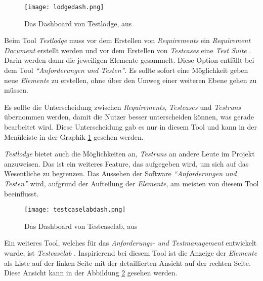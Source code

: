 \documentclass[11pt,a4paper]{report}
\begin{document}

\begin{figure}[htpb]
  \centering
  \texttt{[image: lodgedash.png]}
  \caption{Das Dashboard von Testlodge, aus \cite{testlodge}}
  \label{f:lodgedash}
\end{figure}


Beim Tool \textit{Testlodge} muss vor dem Erstellen von \textit{Requirements} ein \textit{Requirement Document} erstellt werden und vor dem Erstellen von \textit{Testcases} eine \textit{Test Suite} \cite{testlodge}. Darin werden dann die jeweiligen Elemente gesammelt. Diese Option entfällt bei dem Tool \textit{"`Anforderungen und Testen"'}. Es sollte sofort eine Möglichkeit geben neue \textit{Elemente} zu erstellen, ohne über den Umweg einer weiteren Ebene gehen zu müssen.

Es sollte die Unterscheidung zwischen \textit{Requirements}, \textit{Testcases} und \textit{Testruns} übernommen werden, damit die Nutzer besser unterscheiden können, was gerade bearbeitet wird. Diese Unterscheidung gab es nur in diesem Tool und kann in der Menüleiste in der Graphik \ref{f:lodgedash} gesehen werden.

\textit{Testlodge} bietet auch die Möglichkeiten an, \textit{Testruns} an andere Leute im Projekt anzuweisen. Das ist ein weiteres Feature, das aufgegeben wird, um sich auf das Wesentliche zu begrenzen. Das Aussehen der Software \textit{"`Anforderungen und Testen"'} wird, aufgrund der Aufteilung der \textit{Elemente}, am meisten von diesem Tool beeinflusst.





















\begin{figure}[htpb]
  \centering
  \texttt{[image: testcaselabdash.png]}
  \caption{Das Dashboard von Testcaselab, aus \cite{testcaselab}}
  \label{f:testcaselabdash}
\end{figure}

Ein weiteres Tool, welches für das \textit{Anforderungs- und Testmanagement} entwickelt wurde, ist \textit{Testcaselab} \cite{testcaselab}. Inspirierend bei diesem Tool ist die Anzeige der \textit{Elemente} als Liste auf der linken Seite mit der detaillierten Ansicht auf der rechten Seite. Diese Ansicht kann in der Abbildung \ref{f:testcaselabdash} gesehen werden. 
\end{document}
